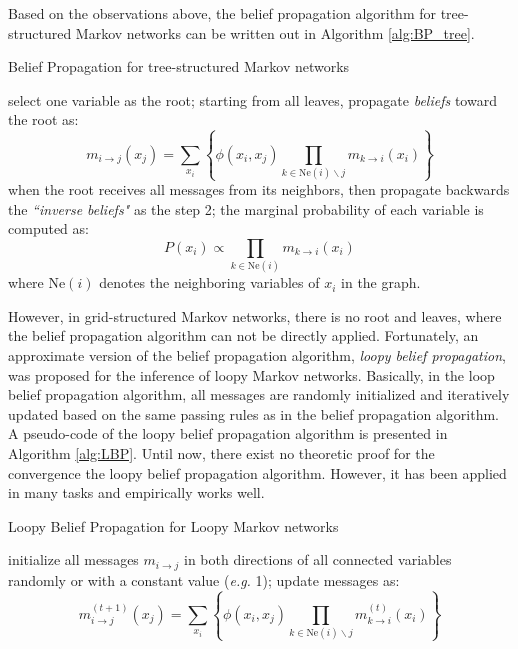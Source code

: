 Based on the observations above, the belief propagation algorithm for tree-structured Markov networks can be written out in Algorithm \ref{alg:BP_tree}.       
\begin{algorithm}
	\caption{Belief Propagation for tree-structured Markov networks}
	\label{alg:BP_tree}
\begin{algorithmic}[1]
\STATE  select one variable as the root; 
\STATE  starting from all leaves, propagate \emph{beliefs} toward the root as:
\begin{equation*}
m_{i \rightarrow j}(x_j)= \sum_{x_i}\left\{\phi(x_i,x_j) \prod_{k\in \text{Ne}(i)\backslash j} m_{k \rightarrow i}(x_i)\right\}
\end{equation*}
\STATE  when the root receives all messages from its neighbors, then propagate backwards the \emph{``inverse beliefs"} as the step 2;
\STATE  the marginal probability of each variable is computed as: 
\begin{equation*}
P(x_i)\propto \prod_{k\in \text{Ne}(i)} m_{k \rightarrow i}(x_i)
\end{equation*}
where Ne$(i)$ denotes the neighboring variables of $x_i$ in the graph. 
\end{algorithmic}
\end{algorithm}


However, in grid-structured Markov networks, there is no root and leaves, where the belief propagation algorithm can not be directly applied.  
Fortunately, an approximate version of the belief propagation algorithm, \emph{loopy belief propagation}, was proposed for the inference of 
loopy Markov networks. Basically, in the loop belief propagation algorithm, all messages are randomly initialized and iteratively updated based on 
the same passing rules as in the belief propagation algorithm.   A pseudo-code of the loopy belief propagation algorithm is presented in Algorithm \ref{alg:LBP}.     
Until now, there exist no theoretic proof for the convergence the loopy belief propagation algorithm. However, it has been applied in many tasks 
and empirically works well.  
\begin{algorithm}
	\caption{Loopy Belief Propagation for Loopy Markov networks}
	\label{alg:LBP}
\begin{algorithmic}[1]
\STATE  initialize all messages $m_{i\rightarrow j}$ in both directions of all connected variables randomly or with a constant value (\emph{e.g.} 1);
\STATE  update messages as:
\begin{equation*}
  m^{(t+1)}_{i \rightarrow j}(x_j)= \sum_{x_i}\left\{\phi(x_i,x_j) \prod_{k\in \text{Ne}(i)\backslash j} m^{(t)}_{k \rightarrow i}(x_i)\right\}
\end{equation*}
\ENDWHILE
\end{algorithmic}
\end{algorithm}

